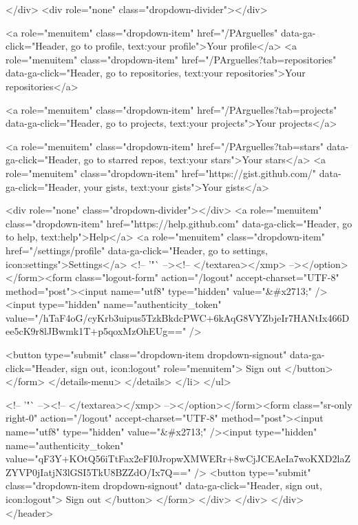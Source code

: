         </div>
        <div role="none" class="dropdown-divider"></div>

        <a role="menuitem" class="dropdown-item" href="/PArguelles" data-ga-click="Header, go to profile, text:your profile">Your profile</a>
        <a role="menuitem" class="dropdown-item" href="/PArguelles?tab=repositories" data-ga-click="Header, go to repositories, text:your repositories">Your repositories</a>

        <a role="menuitem" class="dropdown-item" href="/PArguelles?tab=projects" data-ga-click="Header, go to projects, text:your projects">Your projects</a>

        <a role="menuitem" class="dropdown-item" href="/PArguelles?tab=stars" data-ga-click="Header, go to starred repos, text:your stars">Your stars</a>
          <a role="menuitem" class="dropdown-item" href="https://gist.github.com/" data-ga-click="Header, your gists, text:your gists">Your gists</a>

        <div role="none" class="dropdown-divider"></div>
        <a role="menuitem" class="dropdown-item" href="https://help.github.com" data-ga-click="Header, go to help, text:help">Help</a>
        <a role="menuitem" class="dropdown-item" href="/settings/profile" data-ga-click="Header, go to settings, icon:settings">Settings</a>
        <!-- '"` --><!-- </textarea></xmp> --></option></form><form class="logout-form" action="/logout" accept-charset="UTF-8" method="post"><input name="utf8" type="hidden" value="&#x2713;" /><input type="hidden" name="authenticity_token" value="/hTaF4oG/cyKrb3uipus5TzkBkdcPWC+6kAqG8VYZbjeIr7HANtIx466Dee5cK9r8lJBwmk1T+p5qoxMzOhEUg==" />
          
          <button type="submit" class="dropdown-item dropdown-signout" data-ga-click="Header, sign out, icon:logout" role="menuitem">
            Sign out
          </button>
</form>      </details-menu>
    </details>
  </li>
</ul>



        <!-- '"` --><!-- </textarea></xmp> --></option></form><form class="sr-only right-0" action="/logout" accept-charset="UTF-8" method="post"><input name="utf8" type="hidden" value="&#x2713;" /><input type="hidden" name="authenticity_token" value="qF3Y+KOtQ56iTtFax2eFI0JropwXMWERr+8wCjJCEAeIa7woKXD2laZZYVP0jIatjN3lGSI5TkU8BZZdO/Ix7Q==" />
          <button type="submit" class="dropdown-item dropdown-signout" data-ga-click="Header, sign out, icon:logout">
            Sign out
          </button>
</form>      </div>
    </div>
  </div>
</header>

